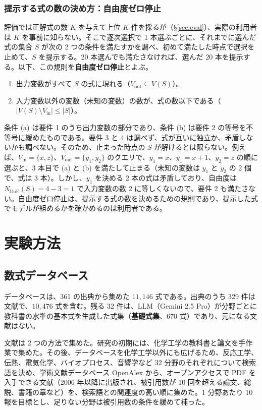 \documentclass[a4j,dvipdfmx,11pt]{jresume}
\newcommand{\Vin}{V_{\mathrm{in}}}
\newcommand{\Vout}{V_{\mathrm{out}}}
\newcommand{\Ndof}{N_{\mathrm{DoF}}}
\begin{document}
\subsubsection{提示する式の数の決め方：自由度ゼロ停止}\label{sec:dofstop}
評価では正解式の数 $K$ を与えて上位 $K$ 件を採るが（\S\ref{sec:eval}）、実際の利用者は $K$ を事前に知らない。そこで逐次選択で 1 本選ぶごとに、それまでに選んだ式の集合 $S$ が次の 2 つの条件を満たすかを調べ、初めて満たした時点で選択を止めて、$S$ を提示する。20 本選んでも満たさなければ、選んだ 20 本を提示する。以下、この規則を\textbf{自由度ゼロ停止}とよぶ。
\begin{enumerate}[label=(\alph*), leftmargin=2.2em]
  \item 出力変数がすべて $S$ の式に現れる（$\Vout \subseteq V(S)$）。
  \item 入力変数以外の変数（未知の変数）の数が、式の数以下である（$|V(S) \setminus \Vin| \le |S|$）。
\end{enumerate}
条件 (a) は要件 1 のうち出力変数の部分であり、条件 (b) は要件 2 の等号を不等号に緩めたものである。要件 3 と 4 は調べず、式が互いに独立か、矛盾しないかも調べない。そのため、止まった時点の $S$ が解けるとは限らない。例えば、$\Vin = \{x, z\}$、$\Vout = \{y_1, y_2\}$ のクエリで、$y_1 = x$、$y_1 = x + 1$、$y_2 = z$ の順に選ぶと、3 本目で (a) と (b) を満たして止まる（未知の変数は $y_1$ と $y_2$ の 2 個で、式は 3 本）。しかし、$y_1$ を決める 2 本の式は矛盾しており、自由度は $\Ndof(S) = 4 - 3 = 1$ で入力変数の数 2 に等しくないので、要件 2 も満たさない。自由度ゼロ停止は、提示する式の数を決めるための規則であり、提示した式でモデルが組めるかを確かめるのは利用者である。

\section{実験方法}\label{sec:data}
\subsection{数式データベース}\label{sec:db}
データベースは、361 の出典から集めた $11{,}146$ 式である。出典のうち 329 件は文献で、$10{,}476$ 式を含む。残る 32 件は、LLM（Gemini 2.5 Pro）が分野ごとに教科書の水準の基本式を生成した式集（\textbf{基礎式集}、670 式）であり、元になる文献はない。

文献は 2 つの方法で集めた。研究の初期には、化学工学の教科書と論文を手作業で集めた。その後、データベースを化学工学以外にも広げるため、反応工学、伝熱、電気化学、バイオプロセス、音響学など 32 分野のそれぞれについて検索語を決め、学術文献データベース OpenAlex から、オープンアクセスで PDF を入手できる文献（2006 年以降に出版され、被引用数が 10 回を超える論文、総説、書籍の章など）を、検索語との関連度の高い順に集めた。1 分野あたり 10 報を目標とし、足りない分野は被引用数の条件を緩めて補った。
\end{document}
